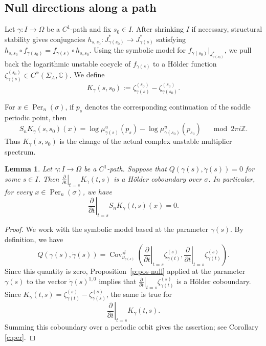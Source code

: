 \documentclass[11pt]{amsart}
\theoremstyle{plain}
\newtheorem{lem}[thm]{Lemma}
\theoremstyle{definition}
\theoremstyle{remark}
\begin{document}
\subsection{Null directions along a path}
Let $\gamma \colon I\to\Omega$ be a $C^1$-path and fix $s_0\in I$. After
shrinking $I$ if necessary, structural stability gives conjugacies
$h_{s,s_0}\colon J_{\gamma(s_0)}^\ast\to J_{\gamma(s)}^\ast$
satisfying
$h_{s,s_0}\circ f_{\gamma(s_0)}=
f_{\gamma(s)}\circ h_{s,s_0}$.
Using the symbolic model for $f_{\gamma(s_0)}|_{J_{\gamma(s_0)}^\ast}$,
we pull back the logarithmic unstable cocycle of $f_{\gamma(s)}$ to a
H\"older function
$\zeta_{\gamma(s)}^{(s_0)}\in C^\alpha(\Sigma_A,\mathbb C).$
We define 
$$K_\gamma(s,s_0):=
\zeta_{\gamma(s)}^{(s_0)}-
\zeta_{\gamma(s_0)}^{(s_0)}.$$


For $x\in\operatorname{Per}_n(\sigma)$, if $p_s$ denotes the corresponding
continuation of the saddle periodic point, then
$$
S_nK_\gamma(s,s_0)(x) = \log \mu^u_{\gamma(s)}(p_s)
- \log \mu^u_{\gamma(s_0)}(p_{s_0})
\quad \mod 2\pi i \mathbb Z.
$$
Thus $K_\gamma(s,s_0)$ is the change of the actual complex unstable
multiplier spectrum.

\begin{lem}\label{lem:5.2}
Let $\gamma \colon I\to\Omega$ be a $C^1$-path. Suppose that
$Q(\gamma(s),\dot\gamma(s))=0$ for some $s\in I$. Then
$\left.\frac{\partial}{\partial t}\right|_{t=s}
K_\gamma(t,s)$
is a H\"older coboundary over $\sigma$. In particular, for every
$x\in\operatorname{Per}_n(\sigma)$, we have
$$
\left.\frac{\partial}{\partial t}\right|_{t=s}
S_nK_\gamma(t,s)(x)=0.
$$
\end{lem}

\begin{proof}
We work with the symbolic model based at the parameter $\gamma(s)$. By definition, we have
$$ Q(\gamma(s),\dot\gamma(s)) = \operatorname{Cov}^{\#}_{\nu_{\gamma(s)}} \left( \left.\frac{\partial}{\partial t}\right|_{t=s} \zeta^{(s)}_{\gamma(t)}, \left.\frac{\partial}{\partial t}\right|_{t=s} \zeta^{(s)}_{\gamma(t)} \right). $$ Since this quantity is zero, Proposition~\ref{p:pos-null} 
applied at the parameter $\gamma(s)$ to the vector $\dot\gamma(s)^{1,0}$ implies that
$\left.\frac{\partial}{\partial t}\right|_{t=s} \zeta^{(s)}_{\gamma(t)}$
is a Hölder coboundary. Since $K_\gamma(t,s)=\zeta^{(s)}_{\gamma(t)} -\zeta^{(s)}_{\gamma(s)}$,
the same is true for $$ \left.\frac{\partial}{\partial t}\right|_{t=s} K_\gamma(t,s). $$ Summing this coboundary over a periodic orbit gives the assertion; see Corollary \ref{c:per}.
\end{proof}
\end{document}
